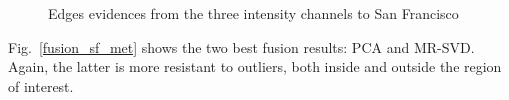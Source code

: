 \documentclass[journal]{IEEEtran}
\begin{document}
\begin{figure}[hbt]
	\centering
	\caption{Edges evidences from the three intensity channels to San Francisco}
	\label{evidencias_sf_hh_hv_vv} 
\end{figure}

Fig.~\ref{fusion_sf_met} shows the two best fusion results: PCA and MR-SVD.
Again, the latter is more resistant to outliers, both inside and outside the region of interest.
\end{document}
